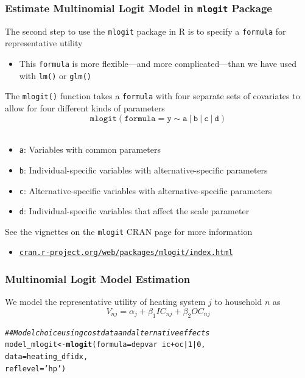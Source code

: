 \documentclass{beamer}\usepackage[]{graphicx}\usepackage[]{color}
\makeatletter
\newcommand{\hlnum}[1]{\textcolor[rgb]{0.686,0.059,0.569}{#1}}%
\newcommand{\hlstr}[1]{\textcolor[rgb]{0.192,0.494,0.8}{#1}}%
\newcommand{\hlcom}[1]{\textcolor[rgb]{0.678,0.584,0.686}{\textit{#1}}}%
\newcommand{\hlopt}[1]{\textcolor[rgb]{0,0,0}{#1}}%
\newcommand{\hlstd}[1]{\textcolor[rgb]{0.345,0.345,0.345}{#1}}%
\newcommand{\hlkwb}[1]{\textcolor[rgb]{0.69,0.353,0.396}{#1}}%
\newcommand{\hlkwc}[1]{\textcolor[rgb]{0.333,0.667,0.333}{#1}}%
\newcommand{\hlkwd}[1]{\textcolor[rgb]{0.737,0.353,0.396}{\textbf{#1}}}%
\newenvironment{kframe}{%
 \def\at@end@of@kframe{}%
 \ifinner\ifhmode%
  \def\at@end@of@kframe{\end{minipage}}%
  \begin{minipage}{\columnwidth}%
 \fi\fi%
 \def\FrameCommand##1{\hskip\@totalleftmargin \hskip-\fboxsep
 \colorbox{shadecolor}{##1}\hskip-\fboxsep
     \hskip-\linewidth \hskip-\@totalleftmargin \hskip\columnwidth}%
 \MakeFramed {\advance\hsize-\width
   \@totalleftmargin\z@ \linewidth\hsize
   \@setminipage}}%
 {\par\unskip\endMakeFramed%
 \at@end@of@kframe}
\newenvironment{knitrout}{}{} %
\makeatother
\begin{document}
\begin{frame}\frametitle{Estimate Multinomial Logit Model in \texttt{mlogit} Package}
    The second step to use the \texttt{mlogit} package in R is to specify a \texttt{formula} for representative utility
    \begin{itemize}
    	\item This \texttt{formula} is more flexible---and more complicated---than we have used with \texttt{lm()} or \texttt{glm()}
    \end{itemize}
    \vspace{1ex}
    The \texttt{mlogit()} function takes a \texttt{formula} with four separate sets of covariates to allow for four different kinds of parameters
    $$\mathtt{mlogit(formula = y \sim a ~|~ b ~|~ c ~|~ d)}$$ \\
    \begin{itemize}
    	\item \texttt{a}: Variables with common parameters
    	\item \texttt{b}: Individual-specific variables with alternative-specific parameters
    	\item \texttt{c}: Alternative-specific variables with alternative-specific parameters
    	\item \texttt{d}: Individual-specific variables that affect the scale parameter
    \end{itemize}
    \vspace{1ex}
    See the vignettes on the \texttt{mlogit} CRAN page for more information
    \begin{itemize}
    	\item \href{https://cran.r-project.org/web/packages/mlogit/index.html}{\texttt{cran.r-project.org/web/packages/mlogit/index.html}}
    \end{itemize}
\end{frame}

\begin{frame}[fragile]\frametitle{Multinomial Logit Model Estimation}
    We model the representative utility of heating system $j$ to household $n$ as
    $$V_{nj} = \alpha_j + \beta_1 IC_{nj} + \beta_2 OC_{nj}$$
\begin{knitrout}\footnotesize
{}\color{fgcolor}\begin{kframe}
\begin{alltt}
\hlcom{## Model choice using cost data and alternative effects}
\hlstd{model_mlogit} \hlkwb{<-} \hlkwd{mlogit}\hlstd{(}\hlkwc{formula} \hlstd{= depvar} \hlopt{~} \hlstd{ic} \hlopt{+} \hlstd{oc} \hlopt{|} \hlnum{1} \hlopt{|} \hlnum{0}\hlstd{,}
                       \hlkwc{data} \hlstd{= heating_dfidx,}
                       \hlkwc{reflevel} \hlstd{=} \hlstr{'hp'}\hlstd{)}
\end{alltt}
\end{kframe}
\end{knitrout}
\end{frame}
\end{document}

